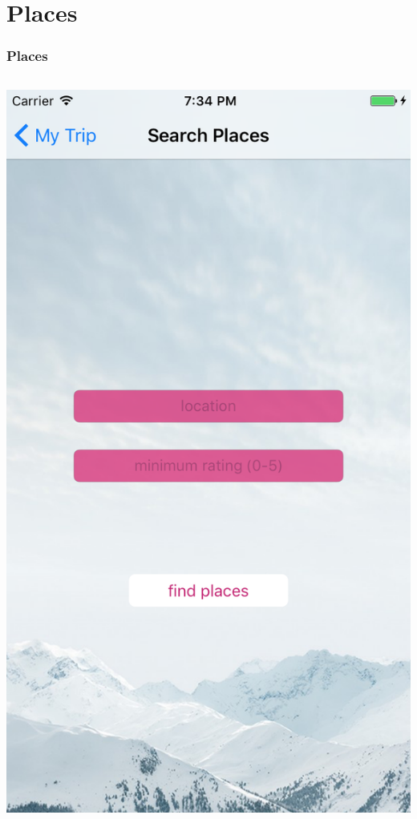\documentclass{beamer}
\begin{document}
\section{Places}
\begin{frame}
\frametitle{Places}
\begin{columns}
    \begin{column}{0.3\textwidth}
        \begin{center}
            \includegraphics[scale=0.3]{placeSearch}

\end{center}
\end{column}
\end{columns}
\end{frame}
\end{document}
